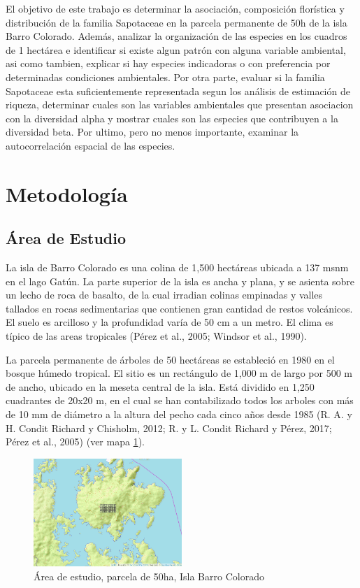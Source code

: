 \documentclass[11pt,]{article}
\begin{document}
El objetivo de este trabajo es determinar la asociación, composición
florística y distribución de la familia Sapotaceae en la parcela
permanente de 50h de la isla Barro Colorado. Además, analizar la
organización de las especies en los cuadros de 1 hectárea e identificar
si existe algun patrón con alguna variable ambiental, asi como tambien,
explicar si hay especies indicadoras o con preferencia por determinadas
condiciones ambientales. Por otra parte, evaluar si la familia
Sapotaceae esta suficientemente representada segun los análisis de
estimación de riqueza, determinar cuales son las variables ambientales
que presentan asociacion con la diversidad alpha y mostrar cuales son
las especies que contribuyen a la diversidad beta. Por ultimo, pero no
menos importante, examinar la autocorrelación espacial de las especies.

\section{Metodología}\label{metodologuxeda}

\subsection{Área de Estudio}\label{uxe1rea-de-estudio}

La isla de Barro Colorado es una colina de 1,500 hectáreas ubicada a 137
msnm en el lago Gatún. La parte superior de la isla es ancha y plana, y
se asienta sobre un lecho de roca de basalto, de la cual irradian
colinas empinadas y valles tallados en rocas sedimentarias que contienen
gran cantidad de restos volcánicos. El suelo es arcilloso y la
profundidad varía de 50 cm a un metro. El clima es típico de las areas
tropicales (Pérez et al., 2005; Windsor et al., 1990).

La parcela permanente de árboles de 50 hectáreas se estableció en 1980
en el bosque húmedo tropical. El sitio es un rectángulo de 1,000 m de
largo por 500 m de ancho, ubicado en la meseta central de la isla. Está
dividido en 1,250 cuadrantes de 20x20 m, en el cual se han contabilizado
todos los arboles con más de 10 mm de diámetro a la altura del pecho
cada cinco años desde 1985 (R. A. y H. Condit Richard y Chisholm, 2012;
R. y L. Condit Richard y Pérez, 2017; Pérez et al., 2005) (ver mapa
\ref{fig:Mapa}).

\begin{figure}
\centering
\includegraphics[width=0.50000\textwidth]{Mapa .png}
\caption{Área de estudio, parcela de 50ha, Isla Barro Colorado
\label{fig:Mapa}}
\end{figure}
\end{document}
